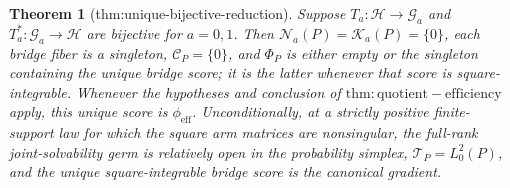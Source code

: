 \documentclass{article}
\newtheorem{theorem}{Theorem}
\begin{document}
\begin{theorem}[thm:unique-bijective-reduction]\label{thm:unique-bijective-reduction}
Suppose \(T_a:\mathcal H\to\mathcal G_a\) and \(T_a^*:\mathcal G_a\to\mathcal H\) are bijective for \(a=0,1\). Then \(\mathcal N_a(P)=\mathcal K_a(P)=\{0\}\), each bridge fiber is a singleton, \(\mathcal C_P=\{0\}\), and \(\Phi_P\) is either empty or the singleton containing the unique bridge score; it is the latter whenever that score is square-integrable. Whenever the hypotheses and conclusion of \(\mathrm{thm:quotient-efficiency}\) apply, this unique score is \(\phi_{\mathrm{eff}}\). Unconditionally, at a strictly positive finite-support law for which the square arm matrices are nonsingular, the full-rank joint-solvability germ is relatively open in the probability simplex, \(\mathcal T_P=L_0^2(P)\), and the unique square-integrable bridge score is the canonical gradient.
\end{theorem}
\end{document}
